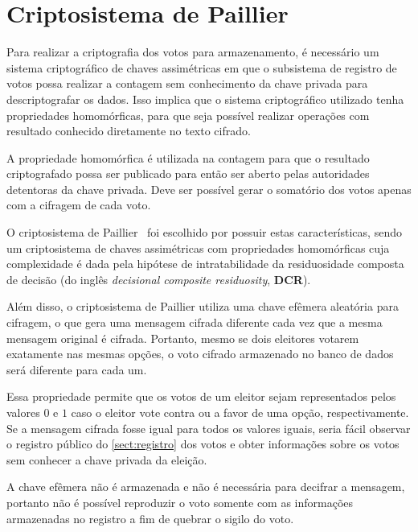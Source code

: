 \section{Criptosistema de Paillier}

Para realizar a criptografia dos votos para armazenamento, é necessário um
sistema criptográfico de chaves assimétricas em que o subsistema de registro de
votos possa realizar a contagem sem conhecimento da chave privada para
descriptografar os dados. Isso implica que o sistema criptográfico utilizado
tenha propriedades homomórficas, para que seja possível realizar operações com
resultado conhecido diretamente no texto cifrado.

A propriedade homomórfica é utilizada na contagem para que o resultado
criptografado possa ser publicado para então ser aberto pelas autoridades
detentoras da chave privada. Deve ser possível gerar o somatório dos votos
apenas com a cifragem de cada voto.

O criptosistema de Paillier~\cite{paillier1999public} foi escolhido por possuir
estas características, sendo um criptosistema de chaves assimétricas com
propriedades homomórficas cuja complexidade é dada pela hipótese de
intratabilidade da residuosidade composta de decisão (do inglês
\textit{decisional composite residuosity}, \textbf{DCR}).

Além disso, o criptosistema de Paillier utiliza uma chave efêmera aleatória
para cifragem, o que gera uma mensagem cifrada diferente cada vez que a mesma
mensagem original é cifrada. Portanto, mesmo se dois eleitores votarem
exatamente nas mesmas opções, o voto cifrado armazenado no banco de dados será
diferente para cada um.

Essa propriedade permite que os votos de um eleitor sejam representados pelos
valores $0$ e $1$ caso o eleitor vote contra ou a favor de uma opção,
respectivamente. Se a mensagem cifrada fosse igual para todos os valores
iguais, seria fácil observar o registro público do \autoref{sect:registro} dos
votos e obter informações sobre os votos sem conhecer a chave privada da
eleição.

A chave efêmera não é armazenada e não é necessária para decifrar a mensagem,
portanto não é possível reproduzir o voto somente com as informações
armazenadas no registro a fim de quebrar o sigilo do voto.
